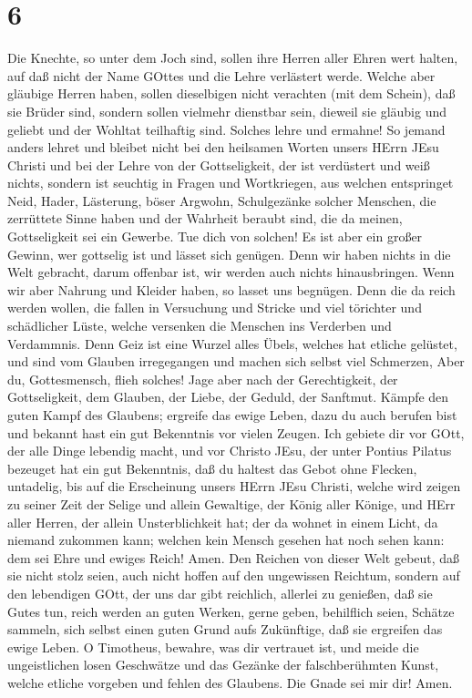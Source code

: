 \hypertarget{section-5}{%
\section{6}\label{section-5}}

 Die Knechte, so unter dem Joch sind, sollen ihre Herren
aller Ehren wert halten, auf daß nicht der Name GOttes und die Lehre
verlästert werde.  Welche aber gläubige Herren haben, sollen
dieselbigen nicht verachten (mit dem Schein), daß sie Brüder sind,
sondern sollen vielmehr dienstbar sein, dieweil sie gläubig und geliebt
und der Wohltat teilhaftig sind. Solches lehre und ermahne! 
So jemand anders lehret und bleibet nicht bei den heilsamen Worten
unsers HErrn JEsu Christi und bei der Lehre von der Gottseligkeit,
 der ist verdüstert und weiß nichts, sondern ist seuchtig in
Fragen und Wortkriegen, aus welchen entspringet Neid, Hader, Lästerung,
böser Argwohn,  Schulgezänke solcher Menschen, die
zerrüttete Sinne haben und der Wahrheit beraubt sind, die da meinen,
Gottseligkeit sei ein Gewerbe. Tue dich von solchen!  Es ist
aber ein großer Gewinn, wer gottselig ist und lässet sich genügen.
 Denn wir haben nichts in die Welt gebracht, darum offenbar
ist, wir werden auch nichts hinausbringen.  Wenn wir aber
Nahrung und Kleider haben, so lasset uns begnügen.  Denn die
da reich werden wollen, die fallen in Versuchung und Stricke und viel
törichter und schädlicher Lüste, welche versenken die Menschen ins
Verderben und Verdammnis.  Denn Geiz ist eine Wurzel alles
Übels, welches hat etliche gelüstet, und sind vom Glauben irregegangen
und machen sich selbst viel Schmerzen,  Aber du,
Gottesmensch, flieh solches! Jage aber nach der Gerechtigkeit, der
Gottseligkeit, dem Glauben, der Liebe, der Geduld, der Sanftmut.
 Kämpfe den guten Kampf des Glaubens; ergreife das ewige
Leben, dazu du auch berufen bist und bekannt hast ein gut Bekenntnis vor
vielen Zeugen.  Ich gebiete dir vor GOtt, der alle Dinge
lebendig macht, und vor Christo JEsu, der unter Pontius Pilatus bezeuget
hat ein gut Bekenntnis,  daß du haltest das Gebot ohne
Flecken, untadelig, bis auf die Erscheinung unsers HErrn JEsu Christi,
 welche wird zeigen zu seiner Zeit der Selige und allein
Gewaltige, der König aller Könige, und HErr aller Herren, 
der allein Unsterblichkeit hat; der da wohnet in einem Licht, da niemand
zukommen kann; welchen kein Mensch gesehen hat noch sehen kann: dem sei
Ehre und ewiges Reich! Amen.  Den Reichen von dieser Welt
gebeut, daß sie nicht stolz seien, auch nicht hoffen auf den ungewissen
Reichtum, sondern auf den lebendigen GOtt, der uns dar gibt reichlich,
allerlei zu genießen,  daß sie Gutes tun, reich werden an
guten Werken, gerne geben, behilflich seien,  Schätze
sammeln, sich selbst einen guten Grund aufs Zukünftige, daß sie
ergreifen das ewige Leben.  O Timotheus, bewahre, was dir
vertrauet ist, und meide die ungeistlichen losen Geschwätze und das
Gezänke der falschberühmten Kunst,  welche etliche vorgeben
und fehlen des Glaubens. Die Gnade sei mir dir! Amen.
